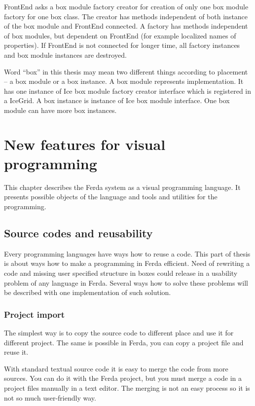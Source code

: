 \documentclass[a4paper,12pt]{book}
\begin{document}
FrontEnd asks a box module factory creator for creation of only one box module factory for one box class. The creator has methods independent of both instance of the box module and FrontEnd connected. A factory has methods independent of box modules, but dependent on FrontEnd (for example localized names of properties). If FrontEnd is not connected for longer time, all factory instances and box module instances are destroyed.

Word ``box'' in this thesis may mean two different things according to placement -- a box module or a box instance. A box module represents implementation. It has one instance of Ice box module factory creator interface which is registered in a IceGrid. A box instance is instance of Ice box module interface. One box module can have more box instances.

\chapter{New features for visual programming}
This chapter describes the Ferda system as a visual programming language. It presents possible objects of the language and tools and utilities for the programming.

\section{Source codes and reusability}
\label{sec:reusability}
Every programming languages have ways how to reuse a code. This part of thesis is about ways how to make a programming in Ferda efficient. Need of rewriting a code and missing user specified structure in boxes could release in a usability problem of any language in Ferda. Several ways how to solve these problems will be described with one implementation of such solution.

\subsection{Project import}
The simplest way is to copy the source code to different place and use it for different project. The same is possible in Ferda, you can copy a project file and reuse it.

With standard textual source code it is easy to merge the code from more sources. You can do it with the Ferda project, but you must merge a code in a project files manually in a text editor. The merging is not an easy process so it is not so much user-friendly way.
\end{document}
